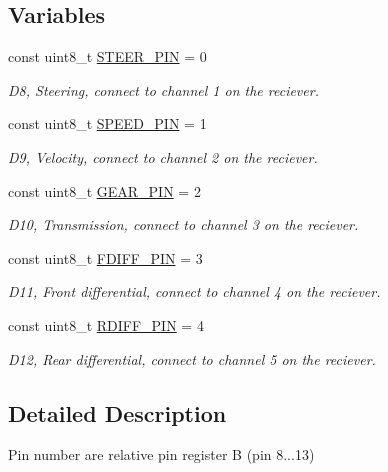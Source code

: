 \subsection*{Variables}
\begin{DoxyCompactItemize}
\item 
const uint8\+\_\+t \hyperlink{group__RecieverPwmPins_ga2a0f80bf9db172cf17bb4b928e861c50}{S\+T\+E\+E\+R\+\_\+\+P\+IN} = 0\hypertarget{group__RecieverPwmPins_ga2a0f80bf9db172cf17bb4b928e861c50}{}\label{group__RecieverPwmPins_ga2a0f80bf9db172cf17bb4b928e861c50}

\begin{DoxyCompactList}\small\item\em D8, Steering, connect to channel 1 on the reciever. \end{DoxyCompactList}\item 
const uint8\+\_\+t \hyperlink{group__RecieverPwmPins_gafee863b6234dfd9b3a4d97265e4a9a8a}{S\+P\+E\+E\+D\+\_\+\+P\+IN} = 1\hypertarget{group__RecieverPwmPins_gafee863b6234dfd9b3a4d97265e4a9a8a}{}\label{group__RecieverPwmPins_gafee863b6234dfd9b3a4d97265e4a9a8a}

\begin{DoxyCompactList}\small\item\em D9, Velocity, connect to channel 2 on the reciever. \end{DoxyCompactList}\item 
const uint8\+\_\+t \hyperlink{group__RecieverPwmPins_gaa1ed2fccc158e7fcb5aab8eb00e39b72}{G\+E\+A\+R\+\_\+\+P\+IN} = 2\hypertarget{group__RecieverPwmPins_gaa1ed2fccc158e7fcb5aab8eb00e39b72}{}\label{group__RecieverPwmPins_gaa1ed2fccc158e7fcb5aab8eb00e39b72}

\begin{DoxyCompactList}\small\item\em D10, Transmission, connect to channel 3 on the reciever. \end{DoxyCompactList}\item 
const uint8\+\_\+t \hyperlink{group__RecieverPwmPins_ga91432e122cb52e765d68aed43104e478}{F\+D\+I\+F\+F\+\_\+\+P\+IN} = 3\hypertarget{group__RecieverPwmPins_ga91432e122cb52e765d68aed43104e478}{}\label{group__RecieverPwmPins_ga91432e122cb52e765d68aed43104e478}

\begin{DoxyCompactList}\small\item\em D11, Front differential, connect to channel 4 on the reciever. \end{DoxyCompactList}\item 
const uint8\+\_\+t \hyperlink{group__RecieverPwmPins_ga98a9ce3925b9f576ed03843a3c6c1623}{R\+D\+I\+F\+F\+\_\+\+P\+IN} = 4\hypertarget{group__RecieverPwmPins_ga98a9ce3925b9f576ed03843a3c6c1623}{}\label{group__RecieverPwmPins_ga98a9ce3925b9f576ed03843a3c6c1623}

\begin{DoxyCompactList}\small\item\em D12, Rear differential, connect to channel 5 on the reciever. \end{DoxyCompactList}\end{DoxyCompactItemize}


\subsection{Detailed Description}
Pin number are relative pin register B (pin 8...13) 